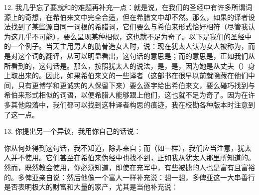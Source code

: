 12. 我几乎忘了要就和的难题再补充一点：就是说，在我们的圣经中有许多所谓词源上的奇想，在希伯来文中完全合适，但在希腊文中却不然。那么，如果的译者设法找到了某些源自同一词根的希腊词，它们要么与希伯来形式恰好相符（尽管我认为这几乎不可能），要么呈现某种相似，这也就不足为奇了。以下是我们的圣经中的一个例子。当天主用男人的肋骨造女人时，说：现在犹太人认为女人被称为，而是对这个词的翻译，从可以明显看出，这句话的意思是；而的意思是，正如我们从所看到的，这句话是。那么，按照犹太人的说法，是，是，因为她是从丈夫（）身上取出来的。因此，如果希伯来文的一些译者（这部书在很早以前就隐藏在他们中间，只有更博学和更诚实的人保留下来）要么逐字给出希伯来文，要么碰巧找到与希伯来形式相似的词语，以便希腊人能够跟上他们，这也就不足为奇了。因为在许多其他段落中，我们都可以找到这种译者构思的痕迹，我在校勘各种版本时注意到了这一点。\par

13. 你提出另一个异议，我用你自己的话说：\par

你从何处得到这句话，我不知道，除非来自；而（如一样），我们应当注意，犹太人并不使用。它们甚至在希伯来伪经中也找不到，正如我从犹太人那里所知道的。然而，既然教会使用，你必须知道，即使在充军中，有些被掳的人也是富有且富裕的。多俾亚亲自说：然后他像一个富人一样补充说：想一想，多俾亚这一大串善行是否表明极大的财富和大量的家产，尤其是当他补充说：\par

